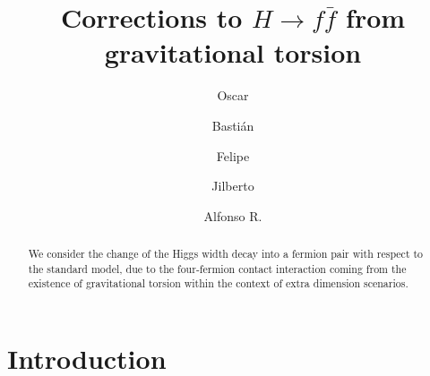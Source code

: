 \documentclass[twocolumn,aps,prd,showkeys,showpacs,groupedaddress]{revtex4-1}
\begin{document}
\title{Corrections to $H \to f \bar{f}$ from gravitational torsion}

\author{Oscar }
\author{Basti\'an }
\author{Felipe }
\author{Jilberto }
\author{Alfonso R. }
\affiliation{\UTFSM,}

\begin{abstract}
  We consider the change of the Higgs width decay into a fermion pair  with respect to the standard model, due to the four-fermion contact interaction coming from the existence of gravitational torsion within the context of extra dimension scenarios. 
\end{abstract}



\maketitle

\section{\label{intro}Introduction}




\end{document}

